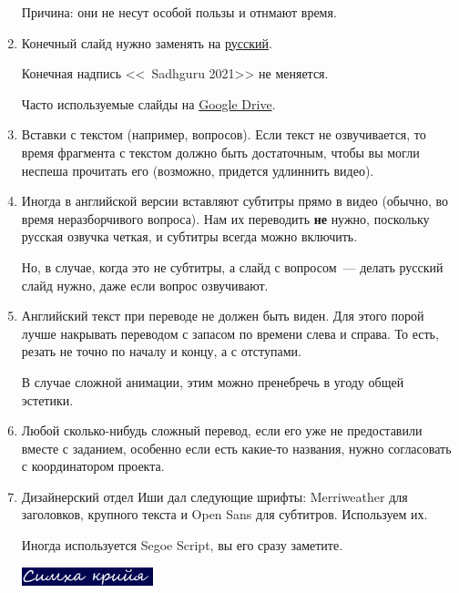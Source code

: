 \documentclass[
a4paper, %
12pt, %
article,
onecolumn, %
openany, %
]{memoir}
\begin{document}
\begin{enumerate}
    {\color{gray}Причина: они не несут особой пользы и отнмают время.}

\item Конечный слайд нужно заменять на \href{https://drive.google.com/file/d/11NbSgvq8LbxDcy-a2WY5OJTKUZKcZx88/view?usp=sharing}{русский}. 

	Конечная надпись <<\textcopyright\ Sadhguru 2021>> не меняется.

 Часто используемые слайды на 
\href{https://drive.google.com/drive/folders/1O54z3DtKpl90ut0Aa8wYkEEP37e00zPY?usp=sharing}{Google Drive}.

\item Вставки с текстом (например, вопросов). Если текст не озвучивается, то время фрагмента с текстом должно быть достаточным, чтобы вы могли неспеша прочитать его (возможно, придется удлиннить видео).

\item Иногда в английской версии вставляют субтитры прямо в видео
    {\color{gray}(обычно, во время неразборчивого вопроса)}. Нам их переводить
    \textbf{не} нужно, поскольку русская озвучка четкая, 
    и субтитры всегда можно включить.

    Но, в случае, когда это не субтитры, а слайд с вопросом~--- 
    делать русский слайд нужно, даже если вопрос озвучивают.
\item Английский текст при переводе не должен быть виден. Для этого порой лучше
    накрывать переводом с запасом по времени слева и справа. То есть, резать
    не точно по началу и концу, а с отступами.

    В случае сложной анимации, этим можно пренебречь в угоду общей эстетики.

\item Любой сколько-нибудь сложный перевод, {\color{gray} если его уже не предоставили вместе с заданием},
    особенно если есть какие-то названия, нужно согласовать с координатором проекта.

\item Дизайнерский отдел Иши дал следующие шрифты: Merriweather для заголовков, крупного текста и Open Sans для субтитров. Используем их.

    Иногда используется Segoe Script, вы его сразу заметите.

 \includegraphics[width=0.3\textwidth]{segoeScript}


\end{enumerate}
\end{document}
